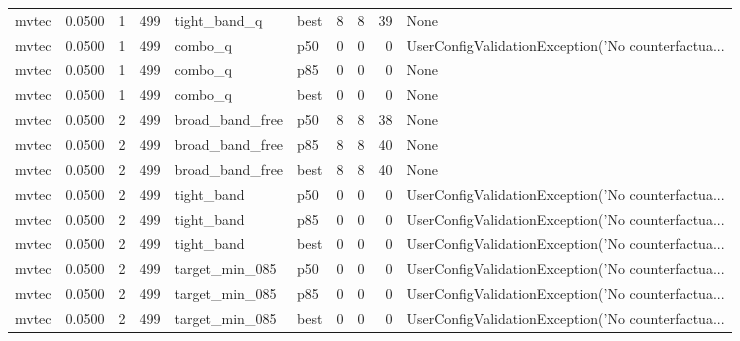 \begin{tabular}{lrrrllrrrl}
   mvtec &    0.0500 &    1 &    499 &         tight\_band\_q &   best &               8 &          8 &      39 &                                               None \\
   mvtec &    0.0500 &    1 &    499 &              combo\_q &    p50 &               0 &          0 &       0 & UserConfigValidationException('No counterfactua... \\
   mvtec &    0.0500 &    1 &    499 &              combo\_q &    p85 &               0 &          0 &       0 &                                               None \\
   mvtec &    0.0500 &    1 &    499 &              combo\_q &   best &               0 &          0 &       0 &                                               None \\
   mvtec &    0.0500 &    2 &    499 &      broad\_band\_free &    p50 &               8 &          8 &      38 &                                               None \\
   mvtec &    0.0500 &    2 &    499 &      broad\_band\_free &    p85 &               8 &          8 &      40 &                                               None \\
   mvtec &    0.0500 &    2 &    499 &      broad\_band\_free &   best &               8 &          8 &      40 &                                               None \\
   mvtec &    0.0500 &    2 &    499 &           tight\_band &    p50 &               0 &          0 &       0 & UserConfigValidationException('No counterfactua... \\
   mvtec &    0.0500 &    2 &    499 &           tight\_band &    p85 &               0 &          0 &       0 & UserConfigValidationException('No counterfactua... \\
   mvtec &    0.0500 &    2 &    499 &           tight\_band &   best &               0 &          0 &       0 & UserConfigValidationException('No counterfactua... \\
   mvtec &    0.0500 &    2 &    499 &       target\_min\_085 &    p50 &               0 &          0 &       0 & UserConfigValidationException('No counterfactua... \\
   mvtec &    0.0500 &    2 &    499 &       target\_min\_085 &    p85 &               0 &          0 &       0 & UserConfigValidationException('No counterfactua... \\
   mvtec &    0.0500 &    2 &    499 &       target\_min\_085 &   best &               0 &          0 &       0 & UserConfigValidationException('No counterfactua... \\

\end{tabular}
